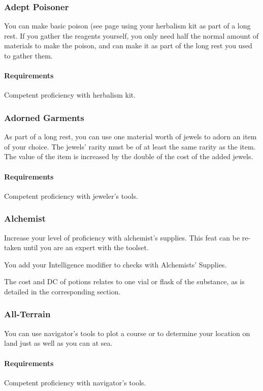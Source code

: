 \subsubsection{Adept Poisoner} \label{feat::adeptpoisoner}
    You can make basic poison (see page \pageref{item::basicpoison} using your herbalism kit as part of a long rest.
    If you gather the reagents yourself, you only need half the normal amount of materials to make the poison, and can make it as part of the long rest you used to gather them.
    \paragraph{Requirements} Competent proficiency with herbalism kit.
\subsubsection{Adorned Garments} \label{feat::adornedgarments}
    As part of a long rest, you can use one material worth of jewels to adorn an item of your choice.
    The jewels' rarity must be of at least the same rarity as the item.
    The value of the item is increased by the double of the cost of the added jewels.
    \paragraph{Requirements} Competent proficiency with jeweler's tools.
\subsubsection{Alchemist} \label{feat::alchemist}
    Increase your level of proficiency with alchemist's supplies.
    This feat can be re-taken until you are an expert with the toolset.

    You add your Intelligence modifier to checks with Alchemists' Supplies.

    The cost and DC of potions relates to one vial or flask of the substance, as is detailed in the corresponding section.
\subsubsection{All-Terrain} \label{feat::allterrain}
    You can use navigator's tools to plot a course or to determine your location on land just as well as you can at sea.
    \paragraph{Requirements} Competent proficiency with navigator's tools.
